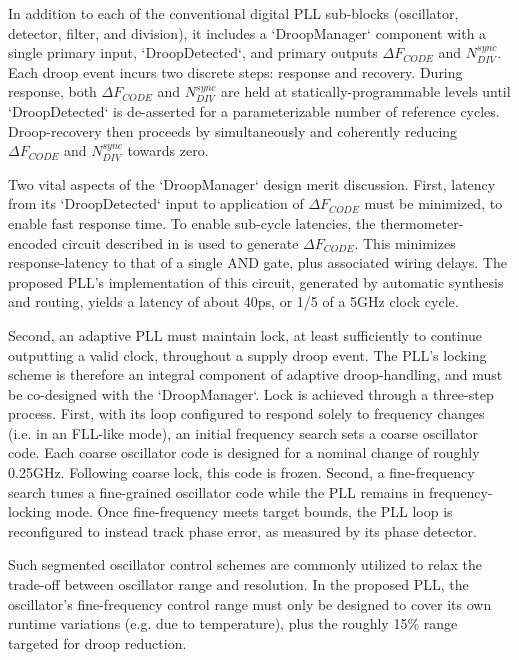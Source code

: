 \documentclass[twoside,9pt,journal,letterpage]{IEEEtran}
\begin{document}
In addition to each of the conventional digital PLL sub-blocks (oscillator, detector, filter, and division), it includes a `DroopManager` component with a single primary input, `DroopDetected`, and primary outputs $\Delta F_{CODE}$ and $N_{DIV}^{sync}$. Each droop event incurs two discrete steps: response and recovery. During response, both $\Delta F_{CODE}$ and $N_{DIV}^{sync}$ are held at statically-programmable levels until `DroopDetected` is de-asserted for a parameterizable number of reference cycles. Droop-recovery then proceeds by simultaneously and coherently reducing $\Delta F_{CODE}$ and $N_{DIV}^{sync}$ towards zero. 

Two vital aspects of the `DroopManager` design merit discussion. First, latency from its `DroopDetected` input to application of $\Delta F_{CODE}$ must be minimized, to enable fast response time. To enable sub-cycle latencies, the thermometer-encoded circuit described in \cite{hashimoto2018} is used to generate $\Delta F_{CODE}$. This minimizes response-latency to that of a single AND gate, plus associated wiring delays. The proposed PLL's implementation of this circuit, generated by automatic synthesis and routing, yields a latency of about 40ps, or 1/5 of a 5GHz clock cycle. 

Second, an adaptive PLL must maintain lock, at least sufficiently to continue outputting a valid clock, throughout a supply droop event. The PLL's locking scheme is therefore an integral component of adaptive droop-handling, and must be co-designed with the `DroopManager`. Lock is achieved through a three-step process. First, with its loop configured to respond solely to frequency changes (i.e. in an FLL-like mode), an initial frequency search sets a coarse oscillator code. Each coarse oscillator code is designed for a nominal change of roughly 0.25GHz. Following coarse lock, this code is frozen. Second, a fine-frequency search tunes a fine-grained oscillator code while the PLL remains in frequency-locking mode. Once fine-frequency meets target bounds, the PLL loop is reconfigured to instead track phase error, as measured by its phase detector. 

Such segmented oscillator control schemes are commonly utilized to relax the trade-off between oscillator range and resolution. In the proposed PLL, the oscillator's fine-frequency control range must only be designed to cover its own runtime variations (e.g. due to temperature), plus the roughly 15\% range targeted for droop reduction. 
\end{document}
